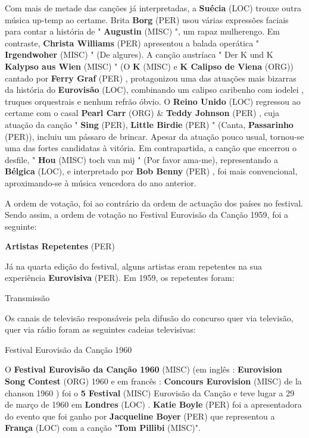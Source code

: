 \documentclass[12pt,a4paper]{article}
\begin{document}
Com mais de metade das canções já interpretadas, a \textbf{Suécia} (LOC) trouxe outra música up-temp ao certame. Brita \textbf{Borg} (PER) usou várias expressões faciais para contar a história de " \textbf{Augustin} (MISC) ", um rapaz mulherengo. Em contraste, \textbf{Christa Williams} (PER) apresentou a balada operática " \textbf{Irgendwoher} (MISC) " (De algures). A canção austríaca " Der K und K \textbf{Kalypso aus Wien} (MISC) " (O \textbf{K} (MISC) e \textbf{K Calipso de Viena} (ORG)) cantado por \textbf{Ferry Graf} (PER) , protagonizou uma das atuações mais bizarras da história do \textbf{Eurovisão} (LOC), combinando um calipso caribenho com iodelei , truques orquestrais e nenhum refrão óbvio. O \textbf{Reino Unido} (LOC) regressou ao certame com o casal \textbf{Pearl Carr} (ORG) \& \textbf{Teddy Johnson} (PER) , cuja atuação da canção " \textbf{Sing} (PER), \textbf{Little Birdie} (PER) " (Canta, \textbf{Passarinho} (PER)), incluiu um pássaro de brincar. Apesar da atuação pouco usual, tornou-se uma das fortes candidatas à vitória. Em contrapartida, a canção que encerrou o desfile, " \textbf{Hou} (MISC) toch van mij " (Por favor ama-me), representando a \textbf{Bélgica} (LOC), e interpretado por \textbf{Bob Benny} (PER) , foi mais convencional, aproximando-se à música vencedora do ano anterior.

A ordem de votação, foi ao contrário da ordem de actuação dos países no festival. Sendo assim, a ordem de votação no Festival Eurovisão da Canção 1959, foi a seguinte:



\textbf{Artistas Repetentes} (PER)

Já na quarta edição do festival, alguns artistas eram repetentes na sua experiência \textbf{Eurovisiva} (PER). Em 1959, os repetentes foram:



Transmissão

Os canais de televisão responsáveis pela difusão do concurso quer via televisão, quer via rádio foram as seguintes cadeias televisivas:



Festival Eurovisão da Canção 1960



O \textbf{Festival Eurovisão da Canção 1960} (MISC) (em inglês : \textbf{Eurovision Song Contest} (ORG) 1960 e em francês : \textbf{Concours Eurovision} (MISC) de la chanson 1960 ) foi o \textbf{5 Festival} (MISC) Eurovisão da Canção e teve lugar a 29 de março de 1960 em \textbf{Londres} (LOC) . \textbf{Katie Boyle} (PER) foi a apresentadora do evento que foi ganho por \textbf{Jacqueline Boyer} (PER) que representou a \textbf{França} (LOC) com a canção "\textbf{Tom Pillibi} (MISC)".
\end{document}

